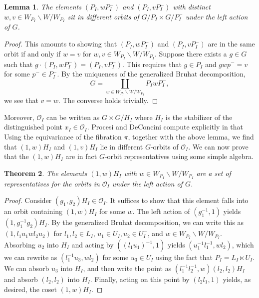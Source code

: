 \documentclass{amsart}
\newtheorem{theorem}{Theorem}[section]
\newtheorem{lemma}[theorem]{Lemma}
\theoremstyle{definition}
\theoremstyle{remark}
\numberwithin{equation}{section}
\begin{document}
\begin{lemma}
The elements $(P_I,wP_I^-)$ and $(P_I,vP_I^-)$ with distinct $w,v\in W_{P_I}\backslash W/W_{P_I}$ sit in different orbits of $G/P_I\times G/P^-_I$ under the left action of $G$.
\label{lem:reps}
\end{lemma}
\begin{proof}
This amounts to showing that $(P_I,wP_I^-)$ and $(P_I,vP_I^-)$ are in the same orbit if and only if $w=v$ for $w,v\in W_{P_I}\backslash W/W_{P_I}$. Suppose there exists a $g\in G$ such that $g\cdot (P_I,wP_I^-)=(P_I,vP_I^-)$. This requires that $g\in P_I$ and $gwp^-=v$ for some $p^-\in P_I^-$. By the uniqueness of the generalized Bruhat decomposition,
\begin{equation}
G=\coprod_{w\in W_{P_I}\backslash W/W_{P_I}} P_I w P^-_I,
\end{equation}
we see that $v=w$. The converse holds trivially.
\end{proof}

Moreover, $\mathcal{O}_I$ can be written as $G\times G/H_I$ where $H_I$ is the stabilizer of the distinguished point $x_I\in \mathcal{O}_I$.
Procesi and DeConcini compute explicitly in \cite{CSV} that 
Using the equivariance of the fibration $\pi$, together with the above lemma, we find that
$(1,w)H_I$ and $(1,v)H_I$ lie in different $G$-orbits of $\mathcal{O}_I$.
We can now prove that the $(1,w)H_I$ are in fact $G$-orbit representatives using some simple algebra.

\begin{theorem}
    The elements $(1,w)H_I$ with $w\in W_{P_I}\backslash W/W_{P_I}$ are a set of representatives for the orbits in $\mathcal{O}_I$ under the left action of $G$.
    \label{thm:reps}
\end{theorem}
\begin{proof}
    Consider $(g_1,g_2)H_I\in \mathcal{O}_I$. It suffices to show that this element falls into an orbit containing $(1,w)H_I$ for some $w$.
    The left action of $(g_1^{-1},1)$ yields $(1,g_1^{-1}g_2)H_I$. By the generalized Bruhat decomposition, we can write this as
    $(1,l_1u_1wl_2u_2)$ for $l_1,l_2\in L_I$, $u_1\in U_I,u_2\in U^-_I$, and $w\in W_{P_I}\backslash W/W_{P_I}$. Absorbing $u_2$ into $H_I$ and
    acting by $((l_1u_1)^{-1},1)$ yields $(u_1^{-1}l_1^{-1},wl_2)$, which we can rewrite as $(l_1^{-1}u_3,wl_2)$ for some $u_3\in U_I$
    using the fact that $P_I=L_I\ltimes U_I$. We can absorb $u_3$ into $H_I$, and then write the point as $(l_1^{-1}l_2^{-1},w)(l_2,l_2)H_I$ and
    absorb $(l_2,l_2)$ into $H_I$. Finally, acting on this point by $(l_2l_1,1)$ yields, as desired, the coset $(1,w)H_I$.
\end{proof}
\end{document}
